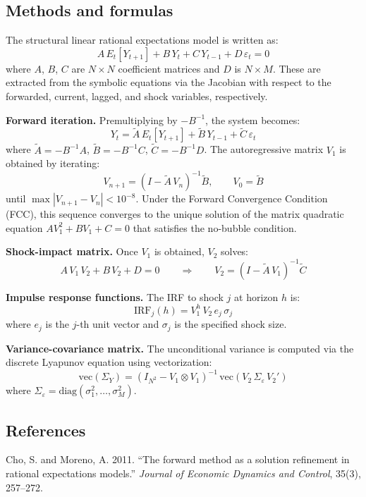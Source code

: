 \documentclass{article}
\begin{document}
\subsection{Methods and formulas}

The structural linear rational expectations model is written as:
\[
A \, E_t[Y_{t+1}] + B \, Y_t + C \, Y_{t-1} + D \, \varepsilon_t = 0
\]
where $A$, $B$, $C$ are $N \times N$ coefficient matrices and $D$ is $N \times M$. These are extracted from the symbolic equations via the Jacobian with respect to the forwarded, current, lagged, and shock variables, respectively.

\medskip
\noindent\textbf{Forward iteration.} Premultiplying by $-B^{-1}$, the system becomes:
\[
Y_t = \tilde{A} \, E_t[Y_{t+1}] + \tilde{B} \, Y_{t-1} + \tilde{C} \, \varepsilon_t
\]
where $\tilde{A} = -B^{-1}A$, $\tilde{B} = -B^{-1}C$, $\tilde{C} = -B^{-1}D$. The autoregressive matrix $V_1$ is obtained by iterating:
\[
V_{n+1} = (I - \tilde{A} \, V_n)^{-1} \tilde{B}, \qquad V_0 = \tilde{B}
\]
until $\max|V_{n+1} - V_n| < 10^{-8}$. Under the Forward Convergence Condition (FCC), this sequence converges to the unique solution of the matrix quadratic equation $A V_1^2 + B V_1 + C = 0$ that satisfies the no-bubble condition.

\medskip
\noindent\textbf{Shock-impact matrix.} Once $V_1$ is obtained, $V_2$ solves:
\[
A \, V_1 \, V_2 + B \, V_2 + D = 0 \qquad \Rightarrow \qquad V_2 = (I - \tilde{A} \, V_1)^{-1} \tilde{C}
\]

\medskip
\noindent\textbf{Impulse response functions.} The IRF to shock $j$ at horizon $h$ is:
\[
\text{IRF}_j(h) = V_1^h \, V_2 \, e_j \, \sigma_j
\]
where $e_j$ is the $j$-th unit vector and $\sigma_j$ is the specified shock size.

\medskip
\noindent\textbf{Variance-covariance matrix.} The unconditional variance is computed via the discrete Lyapunov equation using vectorization:
\[
\text{vec}(\Sigma_Y) = (I_{N^2} - V_1 \otimes V_1)^{-1} \, \text{vec}(V_2 \, \Sigma_\varepsilon \, V_2')
\]
where $\Sigma_\varepsilon = \text{diag}(\sigma_1^2, \ldots, \sigma_M^2)$.

\subsection{References}

Cho, S. and Moreno, A. 2011. ``The forward method as a solution refinement in rational expectations models.'' \textit{Journal of Economic Dynamics and Control}, 35(3), 257--272.
\end{document}
